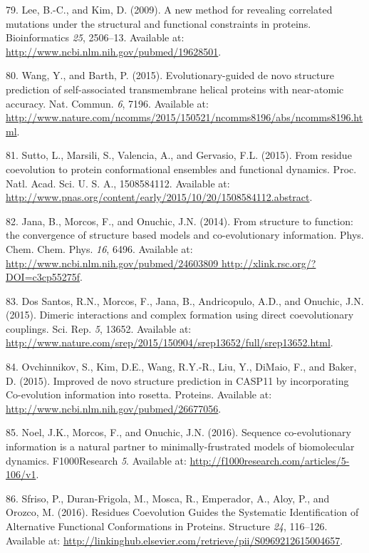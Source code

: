 \documentclass[12pt,a4paper,twoside]{book}
\theoremstyle{definition}
\theoremstyle{definition}
\theoremstyle{remark}
\begin{document}
\hypertarget{ref-Lee2009}{}
79. Lee, B.-C., and Kim, D. (2009). A new method for revealing
correlated mutations under the structural and functional constraints in
proteins. Bioinformatics \emph{25}, 2506--13. Available at:
\url{http://www.ncbi.nlm.nih.gov/pubmed/19628501}.

\hypertarget{ref-Wang2015}{}
80. Wang, Y., and Barth, P. (2015). Evolutionary-guided de novo
structure prediction of self-associated transmembrane helical proteins
with near-atomic accuracy. Nat. Commun. \emph{6}, 7196. Available at:
\url{http://www.nature.com/ncomms/2015/150521/ncomms8196/abs/ncomms8196.html}.

\hypertarget{ref-Sutto2015}{}
81. Sutto, L., Marsili, S., Valencia, A., and Gervasio, F.L. (2015).
From residue coevolution to protein conformational ensembles and
functional dynamics. Proc. Natl. Acad. Sci. U. S. A., 1508584112.
Available at:
\url{http://www.pnas.org/content/early/2015/10/20/1508584112.abstract}.

\hypertarget{ref-Jana2014}{}
82. Jana, B., Morcos, F., and Onuchic, J.N. (2014). From structure to
function: the convergence of structure based models and co-evolutionary
information. Phys. Chem. Chem. Phys. \emph{16}, 6496. Available at:
\href{http://www.ncbi.nlm.nih.gov/pubmed/24603809\%20http://xlink.rsc.org/?DOI=c3cp55275f}{http://www.ncbi.nlm.nih.gov/pubmed/24603809 http://xlink.rsc.org/?DOI=c3cp55275f}.

\hypertarget{ref-DosSantos2015a}{}
83. Dos Santos, R.N., Morcos, F., Jana, B., Andricopulo, A.D., and
Onuchic, J.N. (2015). Dimeric interactions and complex formation using
direct coevolutionary couplings. Sci. Rep. \emph{5}, 13652. Available
at:
\url{http://www.nature.com/srep/2015/150904/srep13652/full/srep13652.html}.

\hypertarget{ref-Ovchinnikov2015b}{}
84. Ovchinnikov, S., Kim, D.E., Wang, R.Y.-R., Liu, Y., DiMaio, F., and
Baker, D. (2015). Improved de novo structure prediction in CASP11 by
incorporating Co-evolution information into rosetta. Proteins. Available
at: \url{http://www.ncbi.nlm.nih.gov/pubmed/26677056}.

\hypertarget{ref-Noel2016}{}
85. Noel, J.K., Morcos, F., and Onuchic, J.N. (2016). Sequence
co-evolutionary information is a natural partner to minimally-frustrated
models of biomolecular dynamics. F1000Research \emph{5}. Available at:
\url{http://f1000research.com/articles/5-106/v1}.

\hypertarget{ref-Sfriso2016}{}
86. Sfriso, P., Duran-Frigola, M., Mosca, R., Emperador, A., Aloy, P.,
and Orozco, M. (2016). Residues Coevolution Guides the Systematic
Identification of Alternative Functional Conformations in Proteins.
Structure \emph{24}, 116--126. Available at:
\url{http://linkinghub.elsevier.com/retrieve/pii/S0969212615004657}.
\end{document}
